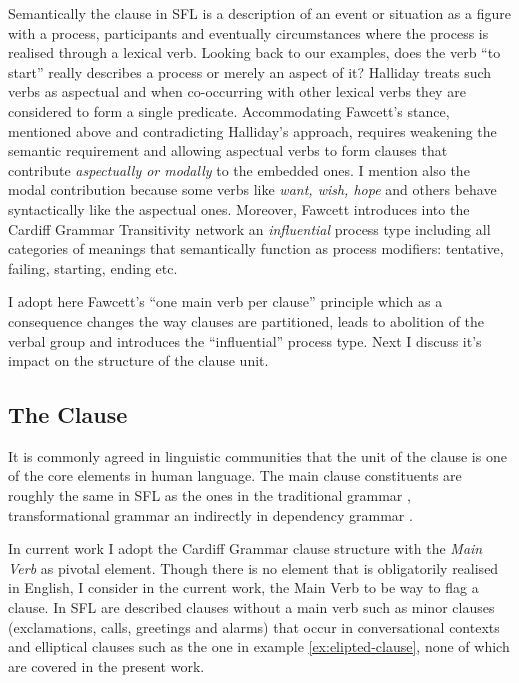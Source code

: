 Semantically the clause in SFL is a description of an event or situation as a figure with a process, participants and eventually circumstances where the process is realised through a lexical verb. Looking back to our examples, does the verb ``to start'' really describes a process or merely an aspect of it? Halliday treats such verbs as aspectual and when co-occurring with other lexical verbs they are considered to form a single predicate. Accommodating Fawcett's stance, mentioned above and contradicting Halliday's approach, requires weakening the semantic requirement and allowing aspectual verbs to form clauses that contribute \textit{aspectually or modally} to the embedded ones. I mention also the modal contribution because some verbs like \textit{want, wish, hope} and others behave syntactically like the aspectual ones. Moreover, Fawcett introduces into the Cardiff Grammar Transitivity network an \textit{influential} process type including all categories of meanings that semantically function as process modifiers: tentative, failing, starting, ending etc.

I adopt here Fawcett's ``one main verb per clause'' principle which as a consequence changes the way clauses are partitioned, leads to abolition of the verbal group and introduces the ``influential'' process type. Next I discuss it's impact on the structure of the clause unit. 

\subsection{The Clause}
\label{sec:cardiff-clause}
It is commonly agreed in linguistic communities that the unit of the clause is one of the core elements in human language. 
The main clause constituents are roughly the same in SFL as the ones in the traditional grammar \citep{Quirk1985}, transformational grammar \citep{Chomsky1957} an indirectly in dependency grammar \citep{Hudson2010}.

In current work I adopt the Cardiff Grammar clause structure with the \textit{Main Verb} as pivotal element. Though there is no element that is obligatorily realised in English, I consider in the current work, the Main Verb to be way to flag a clause. In SFL are described clauses without a main verb such as minor clauses (exclamations, calls, greetings and alarms) that occur in conversational contexts and elliptical clauses \citet{Halliday2013} such as the one in example \ref{ex:elipted-clause}, none of which are covered in the present work.


